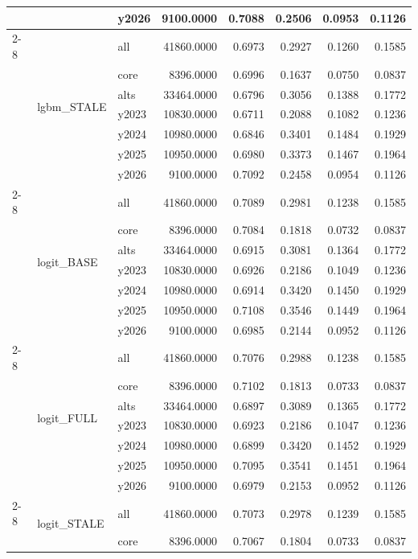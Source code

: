 \begin{tabular}{lllrrrrr}
 &  & y2026 & 9100.0000 & 0.7088 & 0.2506 & 0.0953 & 0.1126 \\
\cline{2-8}
 & \multirow[t]{7}{*}{lgbm_STALE} & all & 41860.0000 & 0.6973 & 0.2927 & 0.1260 & 0.1585 \\
 &  & core & 8396.0000 & 0.6996 & 0.1637 & 0.0750 & 0.0837 \\
 &  & alts & 33464.0000 & 0.6796 & 0.3056 & 0.1388 & 0.1772 \\
 &  & y2023 & 10830.0000 & 0.6711 & 0.2088 & 0.1082 & 0.1236 \\
 &  & y2024 & 10980.0000 & 0.6846 & 0.3401 & 0.1484 & 0.1929 \\
 &  & y2025 & 10950.0000 & 0.6980 & 0.3373 & 0.1467 & 0.1964 \\
 &  & y2026 & 9100.0000 & 0.7092 & 0.2458 & 0.0954 & 0.1126 \\
\cline{2-8}
 & \multirow[t]{7}{*}{logit_BASE} & all & 41860.0000 & 0.7089 & 0.2981 & 0.1238 & 0.1585 \\
 &  & core & 8396.0000 & 0.7084 & 0.1818 & 0.0732 & 0.0837 \\
 &  & alts & 33464.0000 & 0.6915 & 0.3081 & 0.1364 & 0.1772 \\
 &  & y2023 & 10830.0000 & 0.6926 & 0.2186 & 0.1049 & 0.1236 \\
 &  & y2024 & 10980.0000 & 0.6914 & 0.3420 & 0.1450 & 0.1929 \\
 &  & y2025 & 10950.0000 & 0.7108 & 0.3546 & 0.1449 & 0.1964 \\
 &  & y2026 & 9100.0000 & 0.6985 & 0.2144 & 0.0952 & 0.1126 \\
\cline{2-8}
 & \multirow[t]{7}{*}{logit_FULL} & all & 41860.0000 & 0.7076 & 0.2988 & 0.1238 & 0.1585 \\
 &  & core & 8396.0000 & 0.7102 & 0.1813 & 0.0733 & 0.0837 \\
 &  & alts & 33464.0000 & 0.6897 & 0.3089 & 0.1365 & 0.1772 \\
 &  & y2023 & 10830.0000 & 0.6923 & 0.2186 & 0.1047 & 0.1236 \\
 &  & y2024 & 10980.0000 & 0.6899 & 0.3420 & 0.1452 & 0.1929 \\
 &  & y2025 & 10950.0000 & 0.7095 & 0.3541 & 0.1451 & 0.1964 \\
 &  & y2026 & 9100.0000 & 0.6979 & 0.2153 & 0.0952 & 0.1126 \\
\cline{2-8}
 & \multirow[t]{7}{*}{logit_STALE} & all & 41860.0000 & 0.7073 & 0.2978 & 0.1239 & 0.1585 \\
 &  & core & 8396.0000 & 0.7067 & 0.1804 & 0.0733 & 0.0837 \\

\end{tabular}
